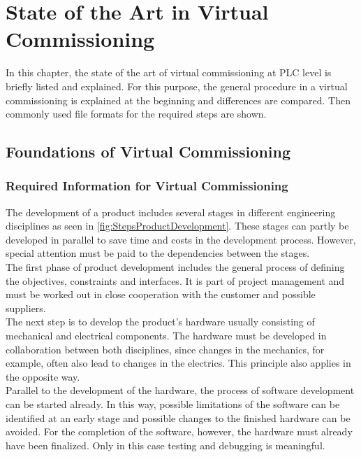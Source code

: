 \chapter{State of the Art in Virtual Commissioning} \label{sec:StateOfTheArt}
    In this chapter, the state of the art of virtual commissioning at PLC level is briefly listed and explained. For this purpose, the general procedure in a virtual commissioning is explained at the beginning and differences are compared. Then commonly used file formats for the required steps are shown.

\section{Foundations of Virtual Commissioning}
\subsection{Required Information for Virtual Commissioning}   \label{sec:DataForVirtualCommissioning}
    The development of a product includes several stages in different engineering disciplines as seen in \autoref{fig:StepsProductDevelopment}. These stages can partly be developed in parallel to save time and costs in the development process. However, special attention must be paid to the dependencies between the stages. \\
    
    The first phase of product development includes the general process of defining the objectives, constraints and interfaces. It is part of project management and must be worked out in close cooperation with the customer and possible suppliers. \\
    
    The next step is to develop the product's hardware usually consisting of mechanical and electrical components. The hardware must be developed in collaboration between both disciplines, since changes in the mechanics, for example, often also lead to changes in the electrics. This principle also applies in the opposite way. \\
    
    Parallel to the development of the hardware, the process of software development can be started already. In this way, possible limitations of the software can be identified at an early stage and possible changes to the finished hardware can be avoided. For the completion of the software, however, the hardware must already have been finalized. Only in this case testing and debugging is meaningful.  \\
    

